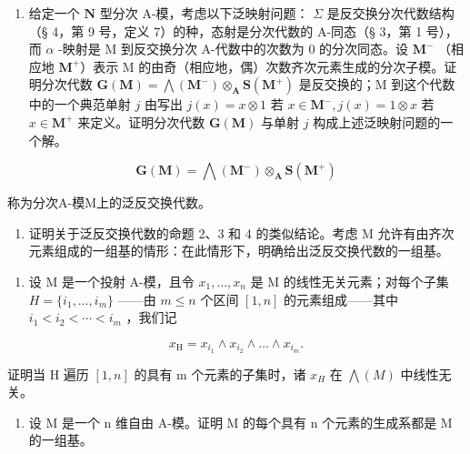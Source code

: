 \begin{enumerate}
\def\labelenumi{(\alph{enumi})}
\setcounter{enumi}{1}
\tightlist
\item
  给定一个 \(\mathbf{N}\) 型分次 A-模，考虑以下泛映射问题： \(\Sigma\) 是反交换分次代数结构（§ 4，第 9 号，定义 7）的种，态射是分次代数的 A-同态（§ 3，第 1 号），而 \(\alpha\) -映射是 M 到反交换分次 A-代数中的次数为 0 的分次同态。设 \(\mathbf{M}^{-}\) （相应地 \(\mathbf{M}^{+}\)）表示 M 的由奇（相应地，偶）次数齐次元素生成的分次子模。证明分次代数 \(\mathbf{G}(\mathbf{M}) = \bigwedge (\mathbf{M}^{-}) \otimes_{\mathbf{A}} \mathbf{S}(\mathbf{M}^{+})\) 是反交换的；M 到这个代数中的一个典范单射 \(j\) 由写出 \(j(x) = x \otimes 1\) 若 \(x \in \mathbf{M}^{-}, j(x) = 1 \otimes x\) 若 \(x \in \mathbf{M}^{+}\) 来定义。证明分次代数 \(\mathbf{G}(\mathbf{M})\) 与单射 \(j\) 构成上述泛映射问题的一个解。
\end{enumerate}

\[
\mathbf {G} (\mathbf {M}) = \bigwedge (\mathbf {M} ^ {-}) \otimes_ {\mathbf {A}} \mathbf {S} (\mathbf {M} ^ {+})
\]

称为分次A-模M上的泛反交换代数。

\begin{enumerate}
\def\labelenumi{(\alph{enumi})}
\setcounter{enumi}{2}
\tightlist
\item
  证明关于泛反交换代数的命题 2、3 和 4 的类似结论。考虑 M 允许有由齐次元素组成的一组基的情形：在此情形下，明确给出泛反交换代数的一组基。
\end{enumerate}

\begin{enumerate}
\def\labelenumi{\arabic{enumi}.}
\setcounter{enumi}{13}
\tightlist
\item
  设 M 是一个投射 A-模，且令 \(x_{1}, \ldots, x_{n}\) 是 M 的线性无关元素；对每个子集 \(H = \{i_{1}, \ldots, i_{m}\}\) ——由 \(m \leqslant n\) 个区间 \([1, n]\) 的元素组成——其中 \(i_{1} < i_{2} < \cdots < i_{m}\) ，我们记
\end{enumerate}

\[
x _ {\mathrm{H}} = x _ {i _ {1}} \wedge x _ {i _ {2}} \wedge \dots \wedge x _ {i _ {m}}.
\]

证明当 H 遍历 \([1, n]\) 的具有 m 个元素的子集时，诸 \(x_{H}\) 在 \(\bigwedge(M)\) 中线性无关。

\begin{enumerate}
\def\labelenumi{\arabic{enumi}.}
\setcounter{enumi}{14}
\tightlist
\item
  设 M 是一个 n 维自由 A-模。证明 M 的每个具有 n 个元素的生成系都是 M 的一组基。
\end{enumerate}

